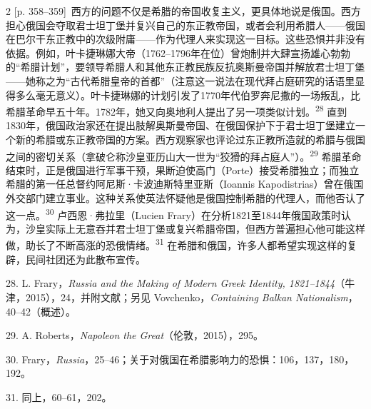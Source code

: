\documentclass[10pt,a4paper]{article}
\begin{document}
\begin{paracol}{2}
{\scriptsize\color{gray}[p. 358–359]}\ 西方的问题不仅是希腊的帝国收复主义，更具体地说是俄国。西方担心俄国会夺取君士坦丁堡并复兴自己的东正教帝国，或者会利用希腊人——俄国在巴尔干东正教中的次级附庸——作为代理人来实现这一目标。这些恐惧并非没有依据。例如，叶卡捷琳娜大帝（1762–1796年在位）曾炮制并大肆宣扬雄心勃勃的“希腊计划”，要领导希腊人和其他东正教民族反抗奥斯曼帝国并解放君士坦丁堡——她称之为“古代希腊皇帝的首都”（注意这一说法在现代拜占庭研究的话语里显得多么毫无意义）。叶卡捷琳娜的计划引发了1770年代伯罗奔尼撒的一场叛乱，比希腊革命早五十年。1782年，她又向奥地利人提出了另一项类似计划。\nobreak\textsuperscript{28} 直到1830年，俄国政治家还在提出肢解奥斯曼帝国、在俄国保护下于君士坦丁堡建立一个新的希腊或东正教帝国的方案。西方观察家也评论过东正教所造就的希腊与俄国之间的密切关系（拿破仑称沙皇亚历山大一世为“狡猾的拜占庭人”）。\nobreak\textsuperscript{29} 希腊革命结束时，正是俄国进行军事干预，果断迫使高门（Porte）接受希腊独立；而独立希腊的第一任总督约阿尼斯·卡波迪斯特里亚斯（Ioannis Kapodistrias）曾在俄国外交部门建立事业。这种关系使英法怀疑他是俄国控制希腊的代理人，而他否认了这一点。\nobreak\textsuperscript{30} 卢西恩·弗拉里（Lucien Frary）在分析1821至1844年俄国政策时认为，沙皇实际上无意吞并君士坦丁堡或复兴希腊帝国，但西方普遍担心他可能这样做，助长了不断高涨的恐俄情绪。\nobreak\textsuperscript{31} 在希腊和俄国，许多人都希望实现这样的复辟，民间社团还为此散布宣传。\par{\small 28. L. Frary，\textit{Russia and the Making of Modern Greek Identity, 1821–1844}（牛津，2015），24，并附文献；另见 Vovchenko，\textit{Containing Balkan Nationalism}，40–42（概述）。\par}{\small 29. A. Roberts，\textit{Napoleon the Great}（伦敦，2015），295。\par}{\small 30. Frary，\textit{Russia}，25–46；关于对俄国在希腊影响力的恐惧：106，137，180，192。\par}{\small 31. 同上，60–61，202。\par}
\switchcolumn

\end{paracol}
\end{document}
